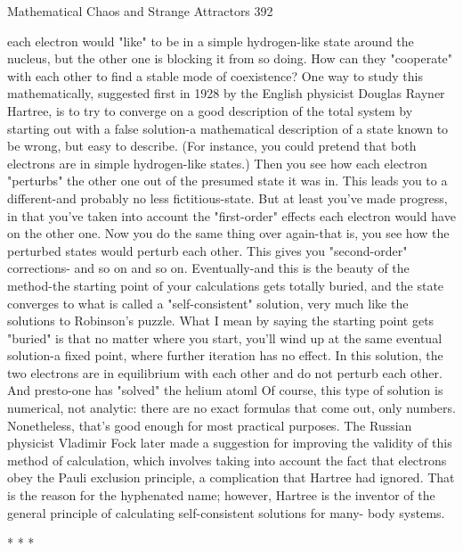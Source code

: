 Mathematical Chaos and Strange Attractors                                                   392

each electron would "like" to be in a simple hydrogen-like state around the nucleus,
but the other one is blocking it from so doing. How can they "cooperate" with each
other to find a stable mode of coexistence?
        One way to study this mathematically, suggested first in 1928 by the English
physicist Douglas Rayner Hartree, is to try to converge on a good description of the
total system by starting out with a false solution-a mathematical description of a state
known to be wrong, but easy to describe. (For instance, you could pretend that both
electrons are in simple hydrogen-like states.) Then you see how each electron
"perturbs" the other one out of the presumed state it was in. This leads you to a
different-and probably no less fictitious-state. But at least you've made progress, in
that you've taken into account the "first-order" effects each electron would have on
the other one. Now you do the same thing over again-that is, you see how the
perturbed states would perturb each other. This gives you "second-order" corrections-
and so on and so on. Eventually-and this is the beauty of the method-the starting point
of your calculations gets totally buried, and the state converges to what is called a
"self-consistent" solution, very much like the solutions to Robinson's puzzle. What I
mean by saying the starting point gets "buried" is that no matter where you start,
you'll wind up at the same eventual solution-a fixed point, where further iteration has
no effect. In this solution, the two electrons are in equilibrium with each other and do
not perturb each other. And presto-one has "solved" the helium atoml
        Of course, this type of solution is numerical, not analytic: there are no exact
formulas that come out, only numbers. Nonetheless, that's good enough for most
practical purposes. The Russian physicist Vladimir Fock later made a suggestion for
improving the validity of this method of calculation, which involves taking into
account the fact that electrons obey the Pauli exclusion principle, a complication that
Hartree had ignored. That is the reason for the hyphenated name; however, Hartree is
the inventor of the general principle of calculating self-consistent solutions for many-
body systems.

                                        *   *   *

